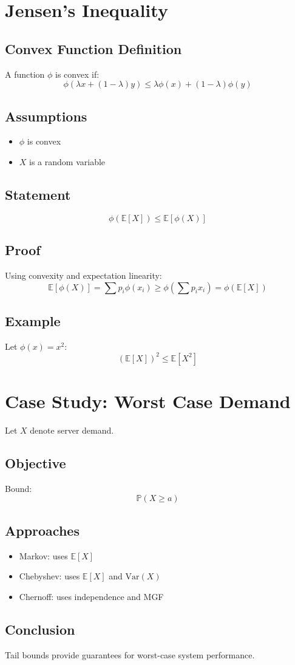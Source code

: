 \documentclass[12pt]{article}
\begin{document}
\section{Jensen’s Inequality}

\subsection{Convex Function Definition}
A function $\phi$ is convex if:
\[
\phi(\lambda x + (1-\lambda)y) \leq \lambda \phi(x) + (1-\lambda)\phi(y)
\]

\subsection{Assumptions}
\begin{itemize}
    \item $\phi$ is convex
    \item $X$ is a random variable
\end{itemize}

\subsection{Statement}
\[
\phi(\mathbb{E}[X]) \leq \mathbb{E}[\phi(X)]
\]

\subsection{Proof}
Using convexity and expectation linearity:
\[
\mathbb{E}[\phi(X)] = \sum p_i \phi(x_i) \geq \phi\left(\sum p_i x_i\right) = \phi(\mathbb{E}[X])
\]

\subsection{Example}
Let $\phi(x) = x^2$:
\[
(\mathbb{E}[X])^2 \leq \mathbb{E}[X^2]
\]

\section{Case Study: Worst Case Demand}

Let $X$ denote server demand.

\subsection{Objective}
Bound:
\[
\mathbb{P}(X \geq a)
\]

\subsection{Approaches}
\begin{itemize}
    \item Markov: uses $\mathbb{E}[X]$
    \item Chebyshev: uses $\mathbb{E}[X]$ and $\text{Var}(X)$
    \item Chernoff: uses independence and MGF
\end{itemize}

\subsection{Conclusion}
Tail bounds provide guarantees for worst-case system performance.
\end{document}
